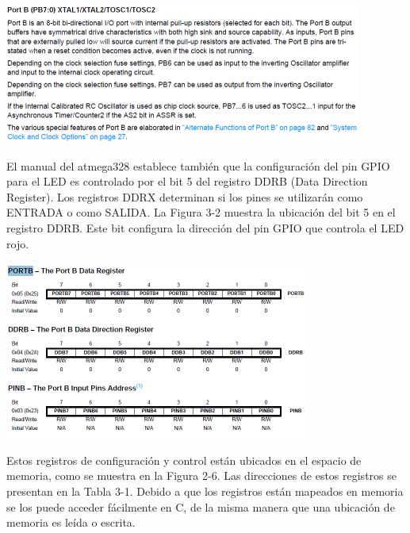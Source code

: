 \documentclass[12pt]{article}
\begin{document}
\begin{center}
\includegraphics{descripcion-registro.png}
\end{center}



El manual del atmega328 establece también que la configuración del pin GPIO para el
LED es controlado por el bit 5 del registro DDRB (Data Direction Register).
Los registros DDRX determinan si los pines se utilizarán como ENTRADA
o como SALIDA.
La Figura 3-2 muestra la ubicación del bit 5 en el registro DDRB. Este
bit configura la dirección del pin GPIO que controla el LED rojo.

\begin{center}
\includegraphics{portb-ddrb.png}
\end{center}

Estos registros de configuración y control están ubicados en el espacio de memoria, como se muestra en la Figura 2-6.
Las direcciones de estos registros se presentan en la Tabla 3-1. 
Debido a que los registros están mapeados en memoria se los puede
acceder fácilmente en C, de la misma manera que una ubicación de memoria
es leída o escrita.

\end{document}
